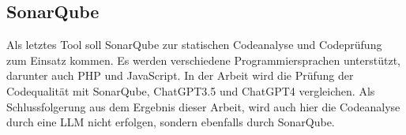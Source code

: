 \subsection{SonarQube}
Als letztes Tool soll SonarQube zur statischen Codeanalyse und Codeprüfung zum Einsatz kommen. Es werden verschiedene Programmiersprachen unterstützt, darunter auch PHP und JavaScript. In der Arbeit \cite{da-silva-simoes-2024} wird die Prüfung der Codequalität mit SonarQube, ChatGPT3.5 und ChatGPT4 vergleichen. Als Schlussfolgerung aus dem Ergebnis dieser Arbeit, wird auch hier die Codeanalyse durch eine LLM nicht erfolgen, sondern ebenfalls durch SonarQube.

